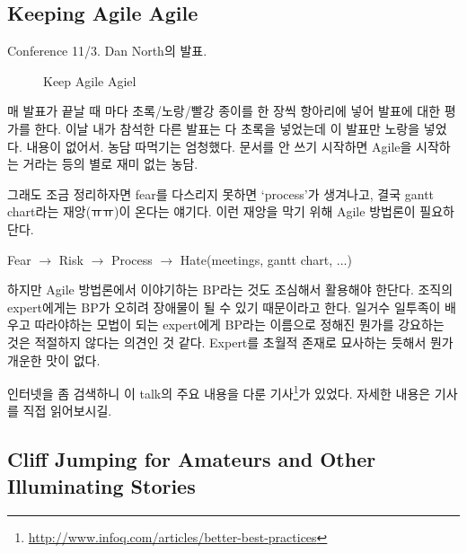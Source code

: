 \documentclass[11pt]{article}
\begin{document}
\subsection{Keeping Agile Agile}

Conference 11/3. Dan North의 발표. 

\begin{figure}[t]
    \begin{Frame}
        \begin{center}
        \end{center}
    \end{Frame}
    \caption{Keep Agile Agiel}
    \label{agile agile}
\end{figure}

매 발표가 끝날 때 마다 초록/노랑/빨강 종이를 한 장씩 항아리에 넣어
발표에 대한 평가를 한다.  이날 내가 참석한 다른 발표는 다 초록을
넣었는데 이 발표만 노랑을 넣었다.  내용이 없어서. 농담 따먹기는 엄청했다. 
문서를 안 쓰기 시작하면 Agile을 시작하는 거라는 등의 별로 재미 없는 농담.

그래도 조금 정리하자면 fear를 다스리지 못하면 `process'가 생겨나고, 
결국 gantt chart라는 재앙(ㅠㅠ)이 온다는 얘기다. 이런 재앙을 막기 위해 Agile 
방법론이 필요하단다.

\begin{center}
Fear $\rightarrow$ Risk $\rightarrow$ Process $\rightarrow$ Hate(meetings, gantt chart, ...)
\end{center}

하지만 Agile 방법론에서 이야기하는 BP라는 것도 조심해서 활용해야 한단다. 
조직의 expert에게는 BP가 오히려 장애물이 될 수 있기 때문이라고 한다.
일거수 일투족이 배우고 따라야하는 모법이 되는 expert에게
BP라는 이름으로 정해진 뭔가를 강요하는 것은 적절하지 않다는 의견인 것 같다.
Expert를 초월적 존재로 묘사하는 듯해서 뭔가 개운한 맛이 없다. 


인터넷을 좀 검색하니 이 talk의 주요 내용을 다룬 
기사\footnote{\url{http://www.infoq.com/articles/better-best-practices}}가 
있었다. 자세한 내용은 기사를 직접 읽어보시길.

\subsection{Cliff Jumping for Amateurs and Other
  Illuminating Stories}
\end{document}
